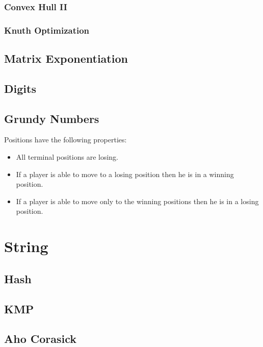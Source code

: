\documentclass[10pt,a4paper]{report}
\begin{document}
		\subsection{Convex Hull II}
		\subsection{Knuth Optimization}
	\newpage
	\section{Matrix Exponentiation}
		
	\newpage
	\section{Digits}
		
	\newpage
	\section{Grundy Numbers}
		Positions have the following properties:
		\begin{itemize}
			\item All terminal positions are losing.
			\item If a player is able to move to a losing position then he is in a winning position.
			\item If a player is able to move only to the winning positions then he is in a losing position.
		\end{itemize}
		
\chapter{String}
	\section{Hash}
		
	\newpage
	\section{KMP}
		
	\newpage
	\section{Aho Corasick}
		
\end{document}
